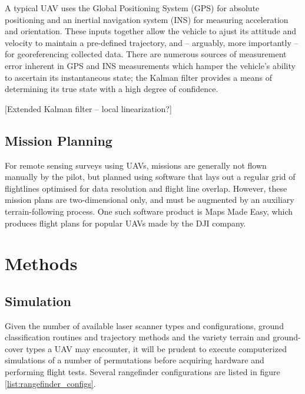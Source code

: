 \documentclass[10pt]{report}
\begin{document}
A typical UAV uses the Global Positioning System (GPS) for absolute positioning and an inertial navigation system (INS) for measuring acceleration and orientation. These inputs together allow the vehicle to ajust its attitude and velocity to maintain a pre-defined trajectory, and -- arguably, more importantly -- for georeferencing collected data. There are numerous sources of measurement error inherent in GPS and INS measurements which hamper the vehicle's ability to ascertain its instantaneous state; the Kalman filter provides a means of determining its true state with a high degree of confidence.

[Extended Kalman filter -- local linearization?]

\fi

\subsection{Mission Planning}


For remote sensing surveys using UAVs, missions are generally not flown manually by the pilot, but planned using software that lays out a regular grid of flightlines optimised for data resolution and flight line overlap. However, these mission plans are two-dimensional only, and must be augmented by an auxiliary terrain-following process. One such software product is Maps Made Easy, which produces flight plans for popular UAVs made by the DJI company.

\section{Methods}

\subsection{Simulation}

Given the number of available laser scanner types and configurations, ground classification routines and trajectory methods and the variety terrain and ground-cover types a UAV may encounter, it will be prudent to execute computerized simulations of a number of permutations before acquiring hardware and performing flight tests. Several rangefinder configurations are listed in figure \ref{list:rangefinder_configs}. 
\end{document}
